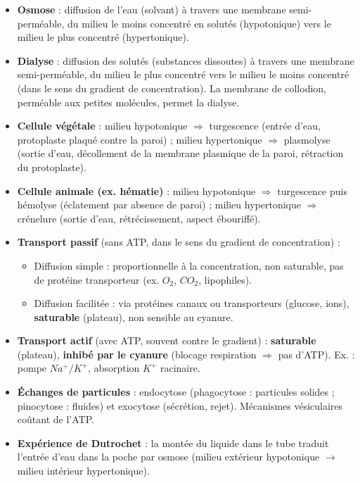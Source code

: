 \documentclass[11pt]{article}
\newcommand{\cle}[1]{{\popxbold\color{popdark}#1}}
\begin{document}
\begin{aretenir}
\begin{itemize}
\item \textbf{Osmose} : diffusion de l'eau (solvant) à travers une membrane semi-perméable, du milieu le moins concentré en solutés (hypotonique) vers le milieu le plus concentré (hypertonique).
\item \textbf{Dialyse} : diffusion des solutés (substances dissoutes) à travers une membrane semi-perméable, du milieu le plus concentré vers le milieu le moins concentré (dans le sens du gradient de concentration). La membrane de collodion, perméable aux petites molécules, permet la dialyse.
\item \textbf{Cellule végétale} : milieu hypotonique $\Rightarrow$ \cle{turgescence} (entrée d'eau, protoplaste plaqué contre la paroi) ; milieu hypertonique $\Rightarrow$ \cle{plasmolyse} (sortie d'eau, décollement de la membrane plasmique de la paroi, rétraction du protoplaste).
\item \textbf{Cellule animale (ex. hématie)} : milieu hypotonique $\Rightarrow$ turgescence puis \cle{hémolyse} (éclatement par absence de paroi) ; milieu hypertonique $\Rightarrow$ \cle{crénelure} (sortie d'eau, rétrécissement, aspect ébouriffé).
\item \textbf{Transport passif} (sans ATP, dans le sens du gradient de concentration) :
      \begin{itemize}
      \item \cle{Diffusion simple} : proportionnelle à la concentration, non saturable, pas de protéine transporteur (ex. $O_2$, $CO_2$, lipophiles).
      \item \cle{Diffusion facilitée} : via protéines canaux ou transporteurs (glucose, ions), \textbf{saturable} (plateau), non sensible au cyanure.
      \end{itemize}
\item \textbf{Transport actif} (avec ATP, souvent contre le gradient) : \textbf{saturable} (plateau), \textbf{inhibé par le cyanure} (blocage respiration $\Rightarrow$ pas d'ATP). Ex. : pompe $Na^+/K^+$, absorption $K^+$ racinaire.
\item \textbf{Échanges de particules} : \cle{endocytose} (phagocytose : particules solides ; pinocytose : fluides) et \cle{exocytose} (sécrétion, rejet). Mécanismes vésiculaires coûtant de l'ATP.
\item \textbf{Expérience de Dutrochet} : la montée du liquide dans le tube traduit l'entrée d'eau dans la poche par osmose (milieu extérieur hypotonique $\rightarrow$ milieu intérieur hypertonique).
\end{itemize}
\end{aretenir}
\end{document}
